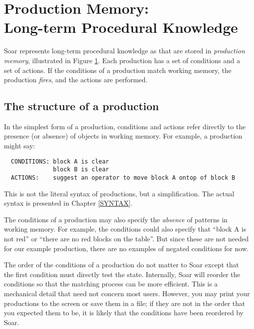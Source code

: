 \section{Production Memory:\\ Long-term Procedural Knowledge} 
\label{ARCH-pm}

\begin{figure}
\label{fig:ab-prodmem}
\end{figure}

Soar represents long-term procedural knowledge as  that are stored in
\emph{production memory}, illustrated in Figure \ref{fig:ab-prodmem}. Each
production has a set of conditions and a set of actions.  If the
conditions of a production match working memory, the production
\emph{fires}, and the actions are performed.

\subsection{The structure of a production}
\label{ARCH-pm-structure}

In the simplest form of a production, conditions and actions refer directly to
the presence (or absence) of objects in working memory. For example, a
production might say:
\begin{verbatim}
  CONDITIONS: block A is clear 
              block B is clear 
  ACTIONS:    suggest an operator to move block A ontop of block B
\end{verbatim}
This is not the literal syntax of productions, but a simplification.
The actual syntax is presented in Chapter \ref{SYNTAX}.

The conditions of a production may also specify the \emph{absence} of patterns
in working memory. For example, the conditions could also specify that ``block
A is not red'' or ``there are no red blocks on the table''. But since these are
not needed for our example production, there are no examples of negated
conditions for now.

The order of the conditions of a production do not matter to Soar except
that the first condition must directly test the state. Internally, Soar
will reorder the conditions so that the matching process can be more
efficient. This is a mechanical detail that need not concern most
users. However, you may print your productions to the screen or save
them in a file; if they are not in the order that you expected them to
be, it is likely that the conditions have been reordered by Soar.

